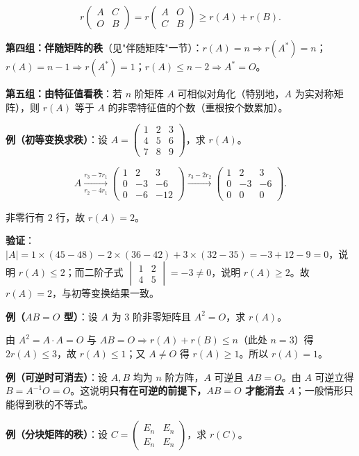 \documentclass[11pt,openany,UTF8]{ctexbook}
\begin{document}
\[r\begin{pmatrix}A&C\\O&B\end{pmatrix}=r\begin{pmatrix}A&O\\C&B\end{pmatrix}\ge r(A)+r(B).\]

\textbf{第四组：伴随矩阵的秩}（见"伴随矩阵"一节）：$r(A)=n\Rightarrow r(A^*)=n$；$r(A)=n-1\Rightarrow r(A^*)=1$；$r(A)\le n-2\Rightarrow A^*=O$。

\textbf{第五组：由特征值看秩}：若 $n$ 阶矩阵 $A$ 可相似对角化（特别地，$A$ 为实对称矩阵），则 $r(A)$ 等于 $A$ 的非零特征值的个数（重根按个数累加）。

\textbf{例（初等变换求秩）}：设 $A=\begin{pmatrix}1&2&3\\4&5&6\\7&8&9\end{pmatrix}$，求 $r(A)$。

\[A\xrightarrow[r_2-4r_1]{r_3-7r_1}\begin{pmatrix}1&2&3\\0&-3&-6\\0&-6&-12\end{pmatrix}\xrightarrow{r_3-2r_2}\begin{pmatrix}1&2&3\\0&-3&-6\\0&0&0\end{pmatrix}.\]

非零行有 $2$ 行，故 $r(A)=2$。

\textbf{验证}：$\vert A\vert=1\times(45-48)-2\times(36-42)+3\times(32-35)=-3+12-9=0$，说明 $r(A)\le2$；而二阶子式 $\begin{vmatrix}1&2\\4&5\end{vmatrix}=-3\ne0$，说明 $r(A)\ge2$。故 $r(A)=2$，与初等变换结果一致。

\textbf{例（$AB=O$ 型）}：设 $A$ 为 $3$ 阶非零矩阵且 $A^2=O$，求 $r(A)$。

由 $A^2=A\cdot A=O$ 与 $AB=O\Rightarrow r(A)+r(B)\le n$（此处 $n=3$）得 $2r(A)\le3$，故 $r(A)\le1$；又 $A\ne O$ 得 $r(A)\ge1$。所以 $r(A)=1$。

\textbf{例（可逆时可消去）}：设 $A,B$ 均为 $n$ 阶方阵，$A$ 可逆且 $AB=O$。由 $A$ 可逆立得 $B=A^{-1}O=O$。这说明\textbf{只有在可逆的前提下，$AB=O$ 才能消去 $A$}；一般情形只能得到秩的不等式。

\textbf{例（分块矩阵的秩）}：设 $C=\begin{pmatrix}E_n&E_n\\E_n&E_n\end{pmatrix}$，求 $r(C)$。
\end{document}

